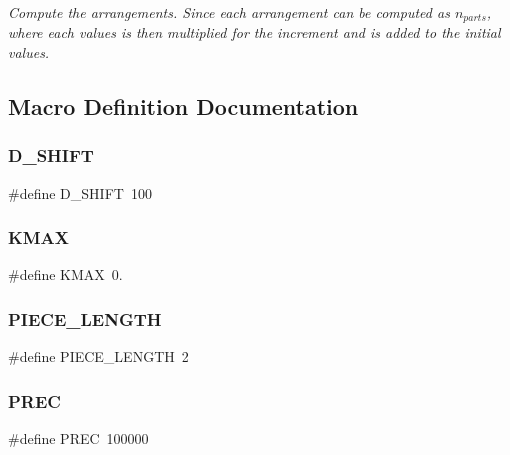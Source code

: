 \begin{DoxyCompactItemize}
\begin{DoxyCompactList}\small\item\em Compute the arrangements. Since each arrangement can be computed as $n_{parts}$, where each values is then multiplied for the increment and is added to the initial values. \end{DoxyCompactList}\end{DoxyCompactItemize}


\subsection{Macro Definition Documentation}
\mbox{\label{dubins_8hh_ad18a9640dcab4f84a2b1710a78bf813e}} 
\subsubsection{\texorpdfstring{D\_SHIFT}{D\_SHIFT}}
{\footnotesize\ttfamily \#define D\+\_\+\+S\+H\+I\+FT~100}

\mbox{\label{dubins_8hh_a940b85a83458e94519f2685b33ddd276}} 
\subsubsection{\texorpdfstring{KMAX}{KMAX}}
{\footnotesize\ttfamily \#define K\+M\+AX~0.}

\mbox{\label{dubins_8hh_a5b2500ca93a5100f73dc442d3cfea7d4}} 
\subsubsection{\texorpdfstring{PIECE\_LENGTH}{PIECE\_LENGTH}}
{\footnotesize\ttfamily \#define P\+I\+E\+C\+E\+\_\+\+L\+E\+N\+G\+TH~2}

\mbox{\label{dubins_8hh_a2bda1a81ce3474772a8a1f165e54516e}} 
\subsubsection{\texorpdfstring{PREC}{PREC}}
{\footnotesize\ttfamily \#define P\+R\+EC~100000}



